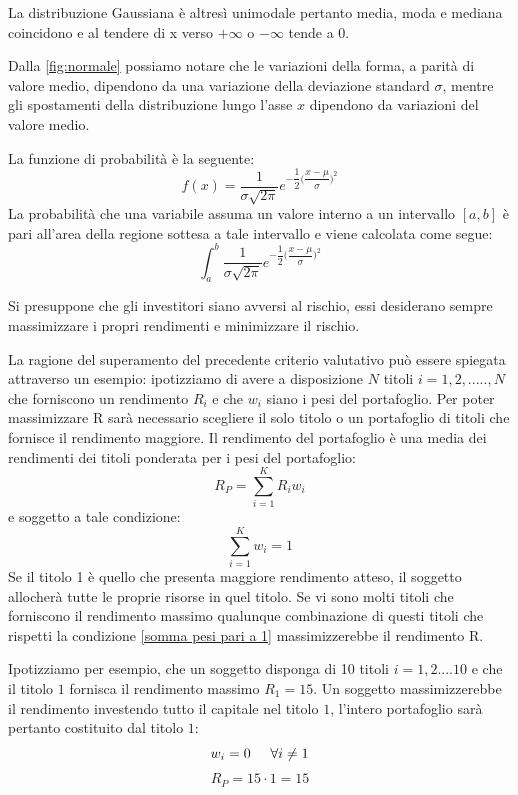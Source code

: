 La distribuzione Gaussiana è altresì unimodale pertanto media, moda e mediana coincidono e al tendere di x verso $+\infty$ o $-\infty$ tende a 0. 

Dalla \ref{fig:normale} possiamo notare che le variazioni della forma, a parità di valore medio, dipendono da una variazione della deviazione standard $\sigma$, mentre gli spostamenti della distribuzione lungo l'asse $x$ dipendono da variazioni del valore medio. 

La funzione di probabilità è la seguente: 
\begin{equation}
f(x)= \frac{1}{\sigma\sqrt{2\pi}}e^{-\dfrac{1}{2}\bigg(\dfrac{x-\mu}{\sigma}\bigg)^2}
\end{equation}
La probabilità che una variabile assuma un valore interno a un intervallo $[a,b]$ è pari all'area della regione sottesa a tale intervallo e viene calcolata come segue: 
\begin{equation}
\int_{a}^{b}{\frac{1}{\sigma\sqrt{2\pi}}e^{-\dfrac{1}{2}\bigg(\dfrac{x-\mu}{\sigma}\bigg)^2}}
\end{equation}

Si presuppone che gli investitori siano avversi al rischio, essi desiderano sempre massimizzare i propri rendimenti e minimizzare il rischio. 

La ragione del superamento del precedente criterio valutativo può essere spiegata attraverso un esempio: ipotizziamo di avere a disposizione ${N}$ titoli $i=1,2,.....,N$ che forniscono un rendimento $R_i$ e che $w_{i}$ siano i pesi del portafoglio.
Per poter massimizzare R sarà necessario scegliere il solo titolo o un portafoglio di titoli che fornisce il rendimento maggiore. Il rendimento del portafoglio è una media dei rendimenti dei titoli ponderata per i pesi del portafoglio: 
\begin{equation}
\label{key}
R_P= \displaystyle\sum_{i=1}^KR_i w_i
\end{equation}
e soggetto a tale condizione: 
\begin{equation}
\label{somma pesi pari a 1}
\displaystyle\sum_{i=1}^K w_i=1
\end{equation}
Se il titolo 1 è quello che presenta maggiore rendimento atteso, il soggetto allocherà tutte le proprie risorse in quel titolo.
Se vi sono molti titoli che forniscono il rendimento massimo qualunque combinazione di questi titoli che rispetti la condizione \ref{somma pesi pari a 1} massimizzerebbe il rendimento R. 

Ipotizziamo per esempio, che un soggetto disponga di 10 titoli $i=1,2....10$ e che il titolo $1$ fornisca il rendimento massimo $R_1=15$. Un soggetto massimizzerebbe il rendimento investendo tutto il capitale nel titolo $1$, l'intero portafoglio sarà pertanto costituito dal titolo $1$:
\begin{equation}
w_i=0 \hspace{0,5cm} \forall i\neq 1 
\end{equation}
\begin{equation}
\label{nondiversificato}
R_P=15\cdot1=15
\end{equation}

